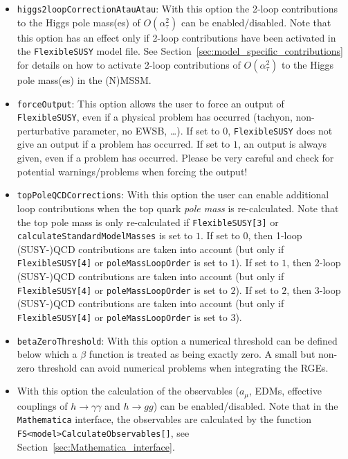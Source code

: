 \documentclass[final,3p,11pt,pdflatex]{elsarticle}
\makeatletter
\newcommand{\fs}{\texttt{FlexibleSUSY}\@\xspace}
\newcommand{\mathematica}{\texttt{Ma\-the\-ma\-ti\-ca}\xspace}
\newcommand{\code}[1]{\lstinline|#1|}  %
\newcommand{\amu}{\ensuremath{a_\mu}\xspace}
\newcommand{\secref}[1]{Section~\ref{#1}}
\def\atau{\alpha_{\tau}}
\makeatother
\begin{document}
\begin{itemize}
\item[\texttt{FlexibleSUSY[11]},]
  \texttt{higgs2loopCorrectionAtauAtau}: With this option the 2-loop
  contributions to the Higgs pole mass(es) of $O(\atau^2)$
  can be enabled/disabled.  Note that this option has an effect only
  if 2-loop contributions have been activated in the \fs model file.
  See \secref{sec:model_specific_contributions} for details on how to
  activate 2-loop contributions of $O(\atau^2)$ to the Higgs pole
  mass(es) in the (N)MSSM\@.

\item[\texttt{FlexibleSUSY[12]},] \texttt{forceOutput}: This option
  allows the user to force an output of \fs, even if a physical
  problem has occurred (tachyon, non-perturbative parameter, no EWSB,
  \ldots).  If set to $0$, \fs does not give an output if a problem
  has occurred.  If set to $1$, an output is always given, even if a
  problem has occurred.  Please be very careful and check for
  potential warnings/problems when forcing the output!

\item[\texttt{FlexibleSUSY[13]},] \texttt{topPoleQCDCorrections}: With
  this option the user can enable additional loop contributions when
  the top quark \emph{pole mass} is re-calculated.  Note that the top pole mass
  is only re-calculated if \texttt{FlexibleSUSY[3]} or
  \texttt{calculateStandardModelMasses} is set to $1$.  If set to
  $0$, then 1-loop (SUSY-)QCD contributions are taken into account (but
  only if \texttt{FlexibleSUSY[4]} or \texttt{poleMassLoopOrder} is
  set to $1$).  If set to $1$, then 2-loop (SUSY-)QCD contributions are
  taken into account (but only if \texttt{FlexibleSUSY[4]} or
  \texttt{poleMassLoopOrder} is set to $2$).  If set to $2$, then
  3-loop (SUSY-)QCD contributions are taken into account (but only if
  \texttt{FlexibleSUSY[4]} or \texttt{poleMassLoopOrder} is set to
  $3$).

\item[\texttt{FlexibleSUSY[14]},] \texttt{betaZeroThreshold}: With
  this option a numerical threshold can be defined below which a
  $\beta$ function is treated as being exactly zero.  A small but
  non-zero threshold can avoid numerical problems when integrating the
  RGEs.

\item[\texttt{FlexibleSUSY[15]}:] With this option the calculation of
  the observables ($\amu$, EDMs, effective couplings of
  $h\rightarrow\gamma\gamma$ and $h\rightarrow gg$) can be
  enabled/disabled.  Note that in the \mathematica interface, the
  observables are calculated by the function
  \code{FS<model>CalculateObservables[]}, see
  \secref{sec:Mathematica_interface}.


\end{itemize}
\end{document}
